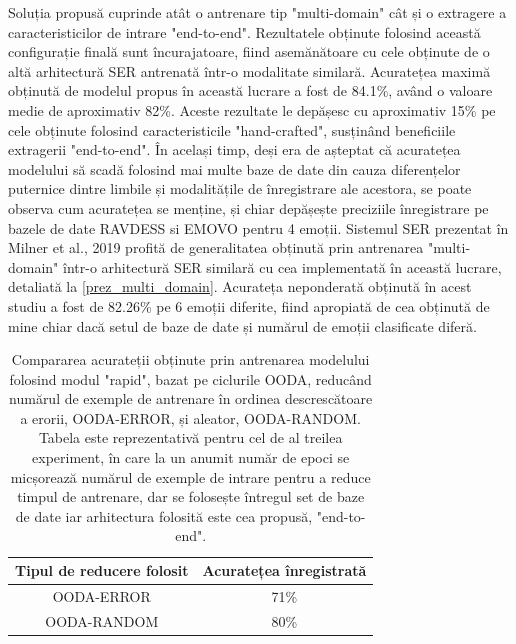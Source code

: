 \documentclass[a4paper,12pt]{book}
\begin{document}
		 \par
		 Soluția propusă cuprinde atât o antrenare tip "multi-domain" cât și o extragere a caracteristicilor de intrare "end-to-end". Rezultatele obținute folosind această configurație finală sunt încurajatoare, fiind asemănătoare cu cele obținute de o altă arhitectură SER antrenată într-o modalitate similară. Acuratețea maximă obținută de modelul propus în această lucrare a fost de 84.1\%, având o valoare medie de aproximativ 82\%. Aceste rezultate le depășesc cu aproximativ 15\% pe cele obținute folosind caracteristicile "hand-crafted", susținând beneficiile extragerii "end-to-end". În același timp, deși era de așteptat că acuratețea modelului să scadă folosind mai multe baze de date din cauza diferențelor  puternice dintre limbile și modalitățile de înregistrare ale acestora, se poate observa cum acuratețea se menține, și chiar depășește preciziile înregistrare pe bazele de date RAVDESS si EMOVO pentru 4 emoții. Sistemul SER prezentat în Milner et al., 2019 \cite{multi-domain} profită de generalitatea obținută prin antrenarea "multi-domain" într-o arhitectură SER similară cu cea implementată în această lucrare, detaliată la \ref{prez_multi_domain}. Acurateța neponderată obținută în acest studiu a fost de 82.26\% pe 6 emoții diferite, fiind apropiată de cea obținută de mine chiar dacă setul de baze de date și numărul de emoții clasificate diferă. \par		 
		 
		 \bgroup
			\def\arraystretch{1.2}
			\begin{table}[t] \centering
				\caption{Compararea acurateții obținute prin antrenarea modelului folosind modul "rapid", bazat pe ciclurile OODA, reducând numărul de exemple de antrenare în ordinea descrescătoare a erorii, OODA-ERROR, și aleator, OODA-RANDOM. Tabela este reprezentativă pentru cel de al treilea experiment, în care la un anumit număr de epoci se micșorează numărul de exemple de intrare pentru a reduce timpul de antrenare, dar se folosește întregul set de baze de date iar arhitectura folosită este cea propusă, "end-to-end".
				}
		 	\begin{tabular}{cc}
		 		\hline
		 		Tipul de reducere folosit & Acuratețea înregistrată	\\ \hline
		 		OODA-ERROR                & 71\%                    \\
		 		OODA-RANDOM               & 80\%                    \\ \hline
		 	\end{tabular}
		 	\label{tab:ooda-table}
		 \end{table}
	 	 \egroup
	
\end{document}
